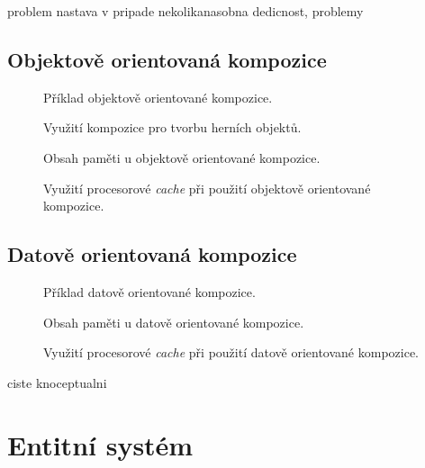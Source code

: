  problem nastava v pripade 
 nekolikanasobna dedicnost, problemy

\subsection{Objektově orientovaná kompozice}
\begin{figure}[H]
	\caption{Příklad objektově orientované kompozice.}
\end{figure}
\begin{figure}[H]
	\caption{Využití kompozice pro tvorbu herních objektů.}
\end{figure}
\begin{figure}[H]
	\caption{Obsah paměti u objektově orientované kompozice.}
\end{figure}
\begin{figure}[H]
	\caption{Využití procesorové \emph{cache} při použití objektově orientované kompozice.}
\end{figure}
\blind[3]

\subsection{Datově orientovaná kompozice}
\label{Chap:DOC}
\begin{figure}[H]
	\caption{Příklad datově orientované kompozice.}
\end{figure}
\begin{figure}[H]
	\caption{Obsah paměti u datově orientované kompozice.}
\end{figure}
\begin{figure}[H]
	\caption{Využití procesorové \emph{cache} při použití datově orientované kompozice.}
\end{figure}
\blind[4]

ciste knoceptualni

\section{Entitní systém}
